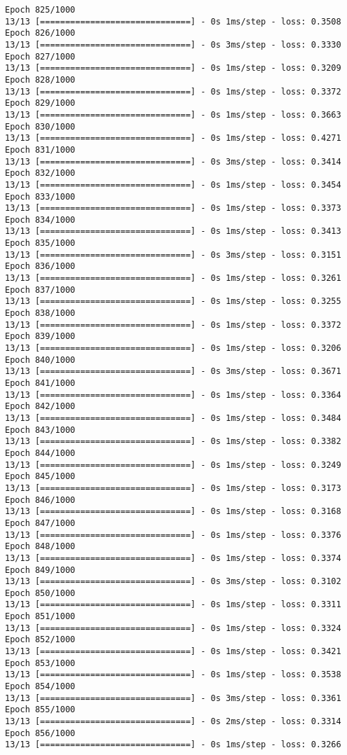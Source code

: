 \documentclass[11pt]{article}
\begin{document}
\begin{Verbatim}[commandchars=\\\{\}]
Epoch 825/1000
13/13 [==============================] - 0s 1ms/step - loss: 0.3508
Epoch 826/1000
13/13 [==============================] - 0s 3ms/step - loss: 0.3330
Epoch 827/1000
13/13 [==============================] - 0s 1ms/step - loss: 0.3209
Epoch 828/1000
13/13 [==============================] - 0s 1ms/step - loss: 0.3372
Epoch 829/1000
13/13 [==============================] - 0s 1ms/step - loss: 0.3663
Epoch 830/1000
13/13 [==============================] - 0s 1ms/step - loss: 0.4271
Epoch 831/1000
13/13 [==============================] - 0s 3ms/step - loss: 0.3414
Epoch 832/1000
13/13 [==============================] - 0s 1ms/step - loss: 0.3454
Epoch 833/1000
13/13 [==============================] - 0s 1ms/step - loss: 0.3373
Epoch 834/1000
13/13 [==============================] - 0s 1ms/step - loss: 0.3413
Epoch 835/1000
13/13 [==============================] - 0s 3ms/step - loss: 0.3151
Epoch 836/1000
13/13 [==============================] - 0s 1ms/step - loss: 0.3261
Epoch 837/1000
13/13 [==============================] - 0s 1ms/step - loss: 0.3255
Epoch 838/1000
13/13 [==============================] - 0s 1ms/step - loss: 0.3372
Epoch 839/1000
13/13 [==============================] - 0s 1ms/step - loss: 0.3206
Epoch 840/1000
13/13 [==============================] - 0s 3ms/step - loss: 0.3671
Epoch 841/1000
13/13 [==============================] - 0s 1ms/step - loss: 0.3364
Epoch 842/1000
13/13 [==============================] - 0s 1ms/step - loss: 0.3484
Epoch 843/1000
13/13 [==============================] - 0s 1ms/step - loss: 0.3382
Epoch 844/1000
13/13 [==============================] - 0s 1ms/step - loss: 0.3249
Epoch 845/1000
13/13 [==============================] - 0s 1ms/step - loss: 0.3173
Epoch 846/1000
13/13 [==============================] - 0s 1ms/step - loss: 0.3168
Epoch 847/1000
13/13 [==============================] - 0s 1ms/step - loss: 0.3376
Epoch 848/1000
13/13 [==============================] - 0s 1ms/step - loss: 0.3374
Epoch 849/1000
13/13 [==============================] - 0s 3ms/step - loss: 0.3102
Epoch 850/1000
13/13 [==============================] - 0s 1ms/step - loss: 0.3311
Epoch 851/1000
13/13 [==============================] - 0s 1ms/step - loss: 0.3324
Epoch 852/1000
13/13 [==============================] - 0s 1ms/step - loss: 0.3421
Epoch 853/1000
13/13 [==============================] - 0s 1ms/step - loss: 0.3538
Epoch 854/1000
13/13 [==============================] - 0s 3ms/step - loss: 0.3361
Epoch 855/1000
13/13 [==============================] - 0s 2ms/step - loss: 0.3314
Epoch 856/1000
13/13 [==============================] - 0s 1ms/step - loss: 0.3266

\end{Verbatim}
\end{document}
